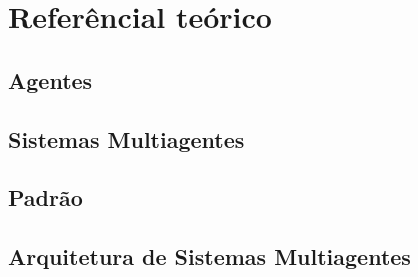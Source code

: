 \chapter[Referêncial teórico]{Referêncial teórico}

\section{Agentes}

\section{Sistemas Multiagentes}

\section{Padrão}

\section{Arquitetura de Sistemas Multiagentes}



